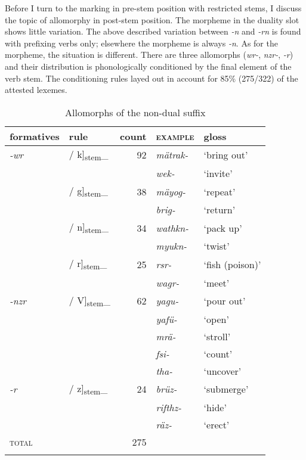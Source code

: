 Before I turn to the  marking in pre-stem position with restricted stems, I discuss the topic of allomorphy in post-stem position. The  morpheme in the duality slot shows little variation. The above described variation between \emph{-n} and \emph{-rn} is found with prefixing verbs only; elsewhere the  morpheme is always \emph{-n}. As for the  morpheme, the situation is different. There are three allomorphs (\emph{wr-}, \emph{nzr-}, \emph{-r}) and their distribution is phonologically conditioned by the final element of the verb stem. The conditioning rules layed out in  account for 85\% (275/322) of the attested  lexemes.

\begin{table}
	\caption{Allomorphs of the non-dual suffix}
	\label{allonondual}
\begin{tabularx}{.8\textwidth}{llrXl}
	\lsptoprule
	{formatives} & {rule} &{count}& {\textsc{example}}& {gloss}\\
	\midrule
	\emph{-wr}& / k]\textsubscript{\tiny{stem}}\_&92& \emph{mätrak-}& `bring out'\\
	&&& \emph{wek-}&`invite'\\
	& / g]\textsubscript{\tiny{stem}}\_	&38& \emph{mäyog-}& `repeat'\\
	&&& \emph{brig-}&`return'\\
	& / n]\textsubscript{\tiny{stem}}\_	&34& \emph{wathkn-}& `pack up'\\
	&&& \emph{myukn-}&`twist'\\
	& / r]\textsubscript{\tiny{stem}}\_	&25& \emph{rsr-}& `fish (poison)'\\
	&&& \emph{wagr-}&`meet'\\\midrule
	\emph{-nzr}	& / V]\textsubscript{\tiny{stem}}\_&62& \emph{yagu-}& `pour out'\\
	&&& \emph{yafü-}& `open'\\
	&&& \emph{mrä-}& `stroll'\\
	&&& \emph{fsi-}& `count'\\
	&&& \emph{tha-}& `uncover'\\\midrule
	\emph{-r}& / z]\textsubscript{\tiny{stem}}\_&24& \emph{brüz-}& `submerge'\\
	&&& \emph{rifthz-}& `hide'\\
	&&& \emph{räz-}& `erect'\\\midrule
	\textsc{total}&&275&&\\
	\lspbottomrule
\end{tabularx}%
\end{table}


